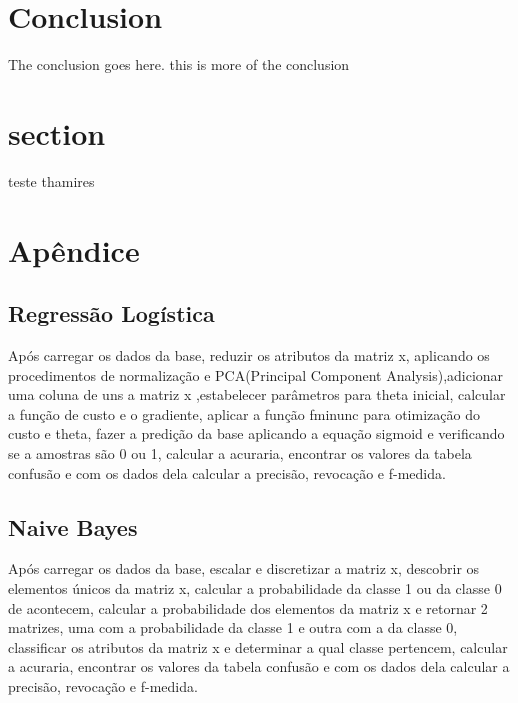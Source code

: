 \documentclass[10pt, conference, compsocconf]{IEEEtran}
\begin{document}
\section{Conclusion}
The conclusion goes here. this is more of the conclusion


\section{section}
teste thamires

%
\section{Apêndice}

\subsection{Regressão Logística}
Após carregar os dados da base, reduzir os atributos da matriz x, aplicando os procedimentos de normalização e PCA(Principal Component Analysis),adicionar uma coluna de uns a matriz x ,estabelecer parâmetros para theta inicial, calcular a função de custo e o gradiente, aplicar a função fminunc para otimização do custo e theta, fazer a predição da base aplicando a equação sigmoid e verificando se a amostras são 0 ou 1, calcular a acuraria, encontrar os valores da tabela confusão e com os dados dela calcular a precisão, revocação e f-medida.

\subsection{Naive Bayes}
Após carregar os dados da base, escalar e discretizar a matriz x, descobrir os elementos únicos da matriz x, calcular a probabilidade da classe 1 ou da classe 0 de acontecem, calcular a probabilidade dos elementos da matriz x e retornar 2 matrizes, uma com a probabilidade da classe 1 e outra com a da classe 0, classificar os atributos da matriz x e determinar a qual classe pertencem, calcular a acuraria, encontrar os valores da tabela confusão e com os dados dela calcular a precisão, revocação e f-medida.



\end{document}
